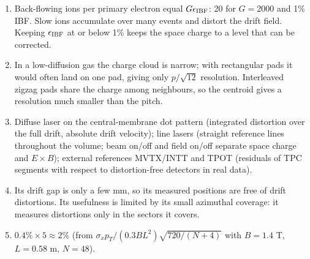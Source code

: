 \documentclass[11pt,letterpaper]{article}
\begin{document}
\begin{enumerate}
\item Back-flowing ions per primary electron equal $G\epsilon_{\rm IBF}$: 20 for $G=2000$ and 1\% IBF. Slow ions accumulate over many events and distort the drift field. Keeping $\epsilon_{\rm IBF}$ at or below 1\% keeps the space charge to a level that can be corrected.
\item In a low-diffusion gas the charge cloud is narrow; with rectangular pads it would often land on one pad, giving only $p/\sqrt{12}$ resolution. Interleaved zigzag pads share the charge among neighbours, so the centroid gives a resolution much smaller than the pitch.
\item Diffuse laser on the central-membrane dot pattern (integrated distortion over the full drift, absolute drift velocity); line lasers (straight reference lines throughout the volume; beam on/off and field on/off separate space charge and $E\times B$); external references MVTX/INTT and TPOT (residuals of TPC segments with respect to distortion-free detectors in real data).
\item Its drift gap is only a few mm, so its measured positions are free of drift distortions. Its usefulness is limited by its small azimuthal coverage: it measures distortions only in the sectors it covers.
\item $0.4\%\times5\approx2\%$ (from $\sigma_x p_T/(0.3BL^2)\sqrt{720/(N+4)}$ with $B=1.4$ T, $L=0.58$ m, $N=48$).
\end{enumerate}

\end{document}
